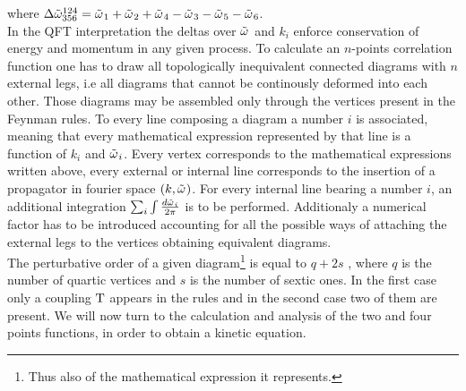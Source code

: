 \begin{center}
\end{center}
where $ \Delta{\tilde{\omega}}^{124}_{356} = \tilde{\omega^{}}_1 + \tilde{\omega^{}}_2 + \tilde{\omega^{}}_4 - \tilde{\omega^{}}_3 - \tilde{\omega^{}}_5 - \tilde{\omega^{}}_6$. \\

In the QFT interpretation the deltas over $\tilde{\omega^{}}$ and $k_i$ enforce conservation of energy and momentum in any given process. To calculate an $n$-points 
correlation function one has to draw all topologically inequivalent connected diagrams with $n$ external legs, i.e all diagrams that cannot be continously deformed into each other.
Those diagrams may be assembled only through the vertices present in the Feynman rules. To every line composing a diagram a number $i$ is associated,
meaning that every mathematical expression represented by that line is a function of $k_i$ and $\tilde{\omega^{}}_i$. Every vertex corresponds to the mathematical expressions 
written above, every external or internal line corresponds to the insertion of a propagator in fourier space $(k, \tilde{\omega^{}})$. For every internal line bearing a number 
$i$, an additional integration $\sum_i \int \frac{d\tilde{\omega^{}}_i}{2\pi}$ is to be performed. Additionaly a numerical factor has to be introduced accounting for all the possible 
ways of attaching the external legs to the vertices obtaining equivalent diagrams. \\
The perturbative order of a given diagram\footnote{Thus also of the mathematical expression it represents.} is equal to $q + 2s$ , where $q$ is the number of quartic vertices 
and $s$ is the number of sextic ones. In the first case only a coupling $\mathrm{T}$ appears in the rules and in the second case two of them are present. 
We will now turn to the calculation and analysis of the two and four points functions, in order to obtain a kinetic equation. \\

